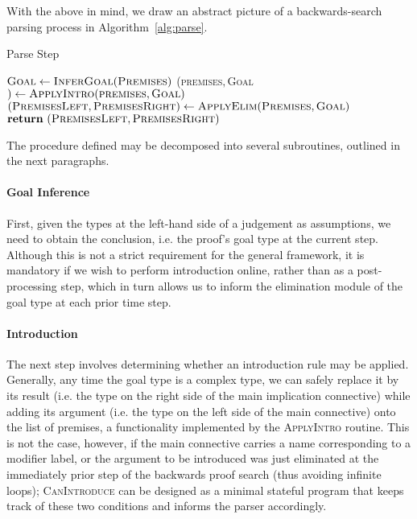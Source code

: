With the above in mind, we draw an abstract picture of a backwards-search parsing process in Algorithm~\ref{alg:parse}.

\begin{algorithm}{
\caption{Parse Step}\label{alg:parse}
\begin{algorithmic}[1]
    \State $\textsc{Goal}\gets \textsc{InferGoal}(\textsc{Premises})$
        \State (\textsc{premises}$, $\textsc{Goal}$) \gets \textsc{ApplyIntro}(\textsc{premises}, \textsc{Goal})$
    \EndWhile
    \State $(\textsc{PremisesLeft}, \textsc{PremisesRight}) \gets \textsc{ApplyElim}(\textsc{Premises}, \textsc{Goal})$
    \State $\textbf{return} \ (\textsc{PremisesLeft}, \textsc{PremisesRight})$
\EndProcedure
\end{algorithmic}
}
\end{algorithm}

The procedure defined may be decomposed into several subroutines, outlined in the next paragraphs.

\paragraph{Goal Inference}
First, given the types at the left-hand side of a judgement as assumptions, we need to obtain the conclusion, i.e. the proof's goal type at the current step.
Although this is not a strict requirement for the general framework, it is mandatory if we wish to perform introduction online, rather than as a post-processing step, which in turn allows us to inform the elimination module of the goal type at each prior time step.

\paragraph{Introduction}
The next step involves determining whether an introduction rule may be applied. 
Generally, any time the goal type is a complex type, we can safely replace it by its result (i.e. the type on the right side of the main implication connective) while adding its argument (i.e. the type on the left side of the main connective) onto the list of premises, a functionality implemented by the \textsc{ApplyIntro} routine.
This is not the case, however, if the main connective carries a name corresponding to a modifier label, or the argument to be introduced was just eliminated at the immediately prior step of the backwards proof search (thus avoiding infinite loops); \textsc{CanIntroduce} can be designed as a minimal stateful program that keeps track of these two conditions and informs the parser accordingly.

